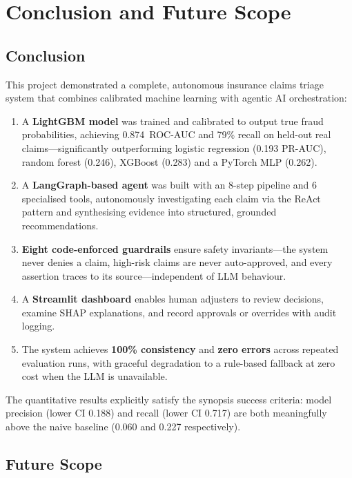 \documentclass[12pt,a4paper]{article}
\begin{document}
\section{Conclusion and Future Scope}
\label{ch:conclusion}

\subsection{Conclusion}

This project demonstrated a complete, autonomous insurance claims triage system that combines calibrated machine learning with agentic AI orchestration:

\begin{enumerate}
    \item A \textbf{LightGBM model} was trained and calibrated to output true fraud probabilities, achieving 0.874~ROC-AUC and 79\% recall on held-out real claims---significantly outperforming logistic regression (0.193 PR-AUC), random forest (0.246), XGBoost (0.283) and a PyTorch MLP (0.262).
    \item A \textbf{LangGraph-based agent} was built with an 8-step pipeline and 6 specialised tools, autonomously investigating each claim via the ReAct pattern and synthesising evidence into structured, grounded recommendations.
    \item \textbf{Eight code-enforced guardrails} ensure safety invariants---the system never denies a claim, high-risk claims are never auto-approved, and every assertion traces to its source---independent of LLM behaviour.
    \item A \textbf{Streamlit dashboard} enables human adjusters to review decisions, examine SHAP explanations, and record approvals or overrides with audit logging.
    \item The system achieves \textbf{100\% consistency} and \textbf{zero errors} across repeated evaluation runs, with graceful degradation to a rule-based fallback at zero cost when the LLM is unavailable.
\end{enumerate}

The quantitative results explicitly satisfy the synopsis success criteria: model precision (lower CI 0.188) and recall (lower CI 0.717) are both meaningfully above the naive baseline (0.060 and 0.227 respectively).

\subsection{Future Scope}
\end{document}
